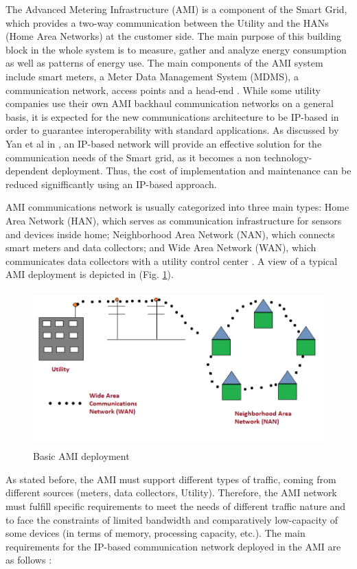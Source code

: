 \documentclass[11pt,final,onecolumn]{IEEEtran}
\begin{document}
The Advanced Metering Infrastructure (AMI) is a component of the Smart Grid, which provides a two-way communication between the Utility and the HANs (Home Area Networks) at the customer side. The main purpose of this building block in the whole system is to measure, gather and analyze energy consumption as well as patterns of energy use. The main components of the AMI system include smart meters, a Meter Data Management System (MDMS), a communication network, access points and a head-end  \cite{Wang2011b} \cite{Bennett2008}. While some utility companies use their own AMI backhaul communication networks on a general basis, it is expected for the new communications architecture to be IP-based in order to guarantee interoperability with standard applications. As discussed by Yan et al in \cite{Yan2013}, an IP-based network will provide an effective solution for the communication needs of the Smart grid, as it becomes a non technology-dependent deployment.  Thus, the cost of implementation and maintenance can be reduced signifficantly using an IP-based approach. 

AMI communications network is usually categorized into three main types: Home Area Network (HAN), which serves as communication infrastructure for sensors and devices inside home; Neighborhood Area Network (NAN), which connects smart meters and data collectors; and Wide Area Network (WAN), which communicates data collectors with a utility control center  \cite{Tang2010}. A view of a typical AMI deployment is depicted in (Fig. \ref{fig:ami}).

\begin{figure}[h!]
\centering
\includegraphics [height=6cm] {basicAMI}
\caption{Basic AMI deployment}
\label{fig:ami}
\end{figure}

As stated before, the AMI must support different types of traffic, coming from different sources (meters, data collectors, Utility). Therefore, the AMI network must fulfill specific requirements to meet the needs of different traffic nature and to face the constraints of limited bandwidth and comparatively low-capacity of some devices (in terms of memory, processing capacity, etc.). The main requirements for the IP-based communication network deployed in the AMI are as follows  \cite{Wang2011b}:
\end{document}
